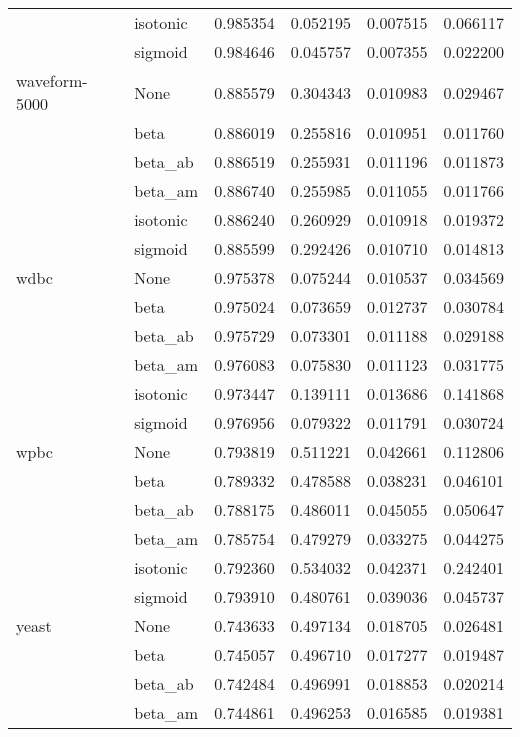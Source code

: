 \begin{tabular}{llrrrr}
        & isotonic &  0.985354 &  0.052195 &  0.007515 &  0.066117 \\
        & sigmoid &  0.984646 &  0.045757 &  0.007355 &  0.022200 \\
waveform-5000 & None &  0.885579 &  0.304343 &  0.010983 &  0.029467 \\
        & beta &  0.886019 &  0.255816 &  0.010951 &  0.011760 \\
        & beta\_ab &  0.886519 &  0.255931 &  0.011196 &  0.011873 \\
        & beta\_am &  0.886740 &  0.255985 &  0.011055 &  0.011766 \\
        & isotonic &  0.886240 &  0.260929 &  0.010918 &  0.019372 \\
        & sigmoid &  0.885599 &  0.292426 &  0.010710 &  0.014813 \\
wdbc & None &  0.975378 &  0.075244 &  0.010537 &  0.034569 \\
        & beta &  0.975024 &  0.073659 &  0.012737 &  0.030784 \\
        & beta\_ab &  0.975729 &  0.073301 &  0.011188 &  0.029188 \\
        & beta\_am &  0.976083 &  0.075830 &  0.011123 &  0.031775 \\
        & isotonic &  0.973447 &  0.139111 &  0.013686 &  0.141868 \\
        & sigmoid &  0.976956 &  0.079322 &  0.011791 &  0.030724 \\
wpbc & None &  0.793819 &  0.511221 &  0.042661 &  0.112806 \\
        & beta &  0.789332 &  0.478588 &  0.038231 &  0.046101 \\
        & beta\_ab &  0.788175 &  0.486011 &  0.045055 &  0.050647 \\
        & beta\_am &  0.785754 &  0.479279 &  0.033275 &  0.044275 \\
        & isotonic &  0.792360 &  0.534032 &  0.042371 &  0.242401 \\
        & sigmoid &  0.793910 &  0.480761 &  0.039036 &  0.045737 \\
yeast & None &  0.743633 &  0.497134 &  0.018705 &  0.026481 \\
        & beta &  0.745057 &  0.496710 &  0.017277 &  0.019487 \\
        & beta\_ab &  0.742484 &  0.496991 &  0.018853 &  0.020214 \\
        & beta\_am &  0.744861 &  0.496253 &  0.016585 &  0.019381 \\

\end{tabular}
